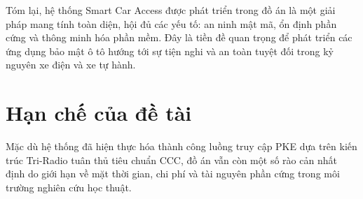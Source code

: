 Tóm lại, hệ thống Smart Car Access được phát triển trong đồ án là một giải pháp mang tính toàn diện, hội đủ các yếu tố: an ninh mật mã, ổn định phần cứng và thông minh hóa phần mềm. Đây là tiền đề quan trọng để phát triển các ứng dụng bảo mật ô tô hướng tới sự tiện nghi và an toàn tuyệt đối trong kỷ nguyên xe điện và xe tự hành.

\section*{Hạn chế của đề tài}

Mặc dù hệ thống đã hiện thực hóa thành công luồng truy cập PKE dựa trên kiến trúc Tri-Radio tuân thủ tiêu chuẩn CCC, đồ án vẫn còn một số rào cản nhất định do giới hạn về mặt thời gian, chi phí và tài nguyên phần cứng trong môi trường nghiên cứu học thuật.

